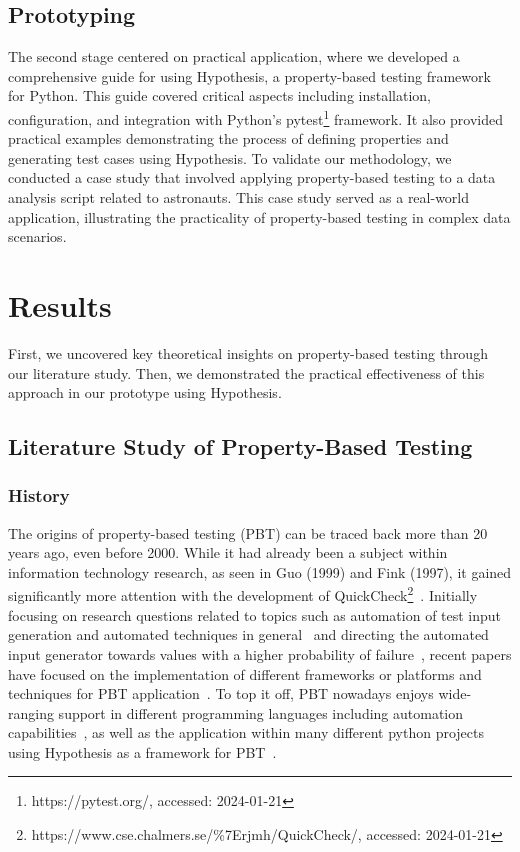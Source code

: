 \documentclass[runningheads]{llncs}
\begin{document}
\subsection{Prototyping}
The second stage centered on practical application, where we developed a comprehensive guide for using Hypothesis, a property-based testing framework for Python. This guide covered critical aspects including installation, configuration, and integration with Python's pytest\footnote{https://pytest.org/, accessed: 2024-01-21} framework. It also provided practical examples demonstrating the process of defining properties and generating test cases using Hypothesis. To validate our methodology, we conducted a case study that involved applying property-based testing to a data analysis script related to astronauts. This case study served as a real-world application, illustrating the practicality of property-based testing in complex data scenarios.

\section{Results}
First, we uncovered key theoretical insights on property-based testing through our literature study. Then, we demonstrated the practical effectiveness of this approach in our prototype using Hypothesis.

\subsection{Literature Study of Property-Based Testing}
\subsubsection{History}
The origins of property-based testing (PBT) can be traced back more than 20 years ago, even before 2000. While it had already been a subject within information technology research, as seen in Guo (1999) and Fink (1997), it gained significantly more attention with the development of QuickCheck\footnote{https://www.cse.chalmers.se/\%7Erjmh/QuickCheck/, accessed: 2024-01-21}~\cite{Shi2023,Guo1999,Fink1997,MacIver2019,Honarvar2020}. Initially focusing on research questions related to topics such as automation of test input generation and automated techniques in general~\cite{Fink1997} and directing the automated input generator towards values with a higher probability of failure~\cite{Loescher2017}, recent papers have focused on the implementation of different frameworks or platforms and techniques for PBT application~\cite{Padhye2019,Honarvar2020,Shi2023,Corgozinho2023}. To top it off, PBT nowadays enjoys wide-ranging support in different programming languages including automation capabilities~\cite{Chen2022,Padhye2019,Honarvar2020,ElazarMittelman2023,Shi2023}, as well as the application within many different python projects using Hypothesis as a framework for PBT~\cite{Corgozinho2023}.
\end{document}

